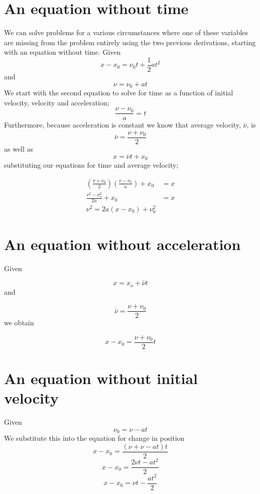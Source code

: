 \documentclass{article}
\begin{document}
\section*{An equation without time}
We can solve problems for a various circumstances where one of these variables are missing from the problem entirely using the two previous derivations, starting with an equation without time. Given
\[
	x - x_0 = \nu_0 t + \frac{1}{2} at^2
\]
and
\[
	\nu = \nu_0 + at
\]
We start with the second equation to solve for time as a function of initial velocity, velocity and acceleration;
\[
	\frac{\nu - \nu_0}{a} = t
\]
Furthermore, because acceleration is constant we know that average velocity, $\bar{\nu}$, is
\[
	\bar{\nu} = \frac{\nu + \nu_0}{2}
\]
as well as
\[
	x = \bar{\nu}t + x_0
\]
substituting our equations for time and average velocity;

\begin{align*}
	\left( \frac{\nu + \nu_0}{2} \right) \left( \frac{\nu - \nu_0}{a} \right) + x_0 &= x \\
	\frac{\nu^2 - \nu_o^2}{2a} + x_0 &= x \\
	\nu^2 = 2a \left( x - x_0 \right) + \nu_0^2
\end{align*}

\section*{An equation without acceleration}
Given

\[
	x = x_o + \bar{\nu}t
\]
and

\[
	\bar{\nu} = \frac{\nu + \nu_0}{2}
\]
we obtain

\[
	x - x_0 = \frac{\nu + \nu_0}{2} t
\]

\section*{An equation without initial velocity}
Given
\[
	\nu_0 = \nu - at
\]
We substitute this into the equation for change in position
\[
	x - x_0 = \frac{\left( \nu + \nu - at \right) t}{2}
\]
\[
	x - x_0 = \frac{2\nu t - at^2}{2}
\]
\[
	x - x_0 = \nu t - \frac{at^2}{2}
\]
\end{document}
